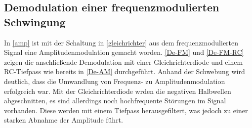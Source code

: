 \subsection{Demodulation einer frequenzmodulierten Schwingung}

In \autoref{amp} ist mit der Schaltung in \autoref{gleichrichter} aus dem frequenzmodulierten Signal eine Amplitudenmodulation gemacht worden. \autoref{De-FM} und \autoref{De-FM-RC} zeigen die anschließende Demodulation mit einer Gleichrichterdiode und einem RC-Tiefpass wie bereits in \autoref{De-AM} durchgeführt.
Anhand der Schwebung wird deutlich, dass die Umwandlung von Frequenz- zu Amplitudenmodulation erfolgreich war. Mit der Gleichrichterdiode wrden die negativen Halbwellen abgeschnitten, es sind allerdings noch hochfrequente Störungen im Signal vorhanden. Diese werden mit einem Tiefpass herausgefiltert, was jedoch zu einer starken Abnahme der Amplitude führt.

